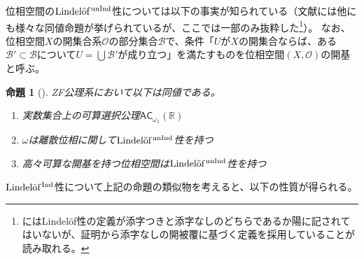 \documentclass{jarticle}
\newtheorem{proposition}{命題}
\newcommand{\WithIndex}[1]{$\textrm{#1}{}^{\,\textrm{\scriptsize Ind}}$}
\newcommand{\WithoutIndex}[1]{$\textrm{#1}{}^{\,\textrm{\scriptsize unInd}}$}
\begin{document}
位相空間の\WithoutIndex{Lindel\"{o}f}性については以下の事実が知られている（文献\cite{HS97}には他にも様々な同値命題が挙げられているが、ここでは一部のみ抜粋した\footnote{\cite{HS97}にはLindel\"{o}f性の定義が添字つきと添字なしのどちらであるか陽に記されてはいないが、証明から添字なしの開被覆に基づく定義を採用していることが読み取れる。}）。
なお、位相空間$X$の開集合系$\mathcal{O}$の部分集合$\mathcal{B}$で、条件「$U$が$X$の開集合ならば、ある$\mathcal{B}' \subset \mathcal{B}$について$U = \bigcup \mathcal{B}'$が成り立つ」を満たすものを位相空間$(X,\mathcal{O})$の開基と呼ぶ。

\begin{proposition}
[{\cite{HS97}}]
\label{prop:equivalence_from_HS97}
ZF公理系において以下は同値である。
\begin{enumerate}
\item
実数集合上の可算選択公理$\mathsf{AC}_{\omega_1}(\mathbb{R})$
\item
$\omega$は離散位相に関して\WithoutIndex{Lindel\"{o}f}性を持つ
\item
高々可算な開基を持つ位相空間は\WithoutIndex{Lindel\"{o}f}性を持つ
\end{enumerate}
\end{proposition}

\WithIndex{Lindel\"{o}f}性について上記の命題の類似物を考えると、以下の性質が得られる。
\end{document}
